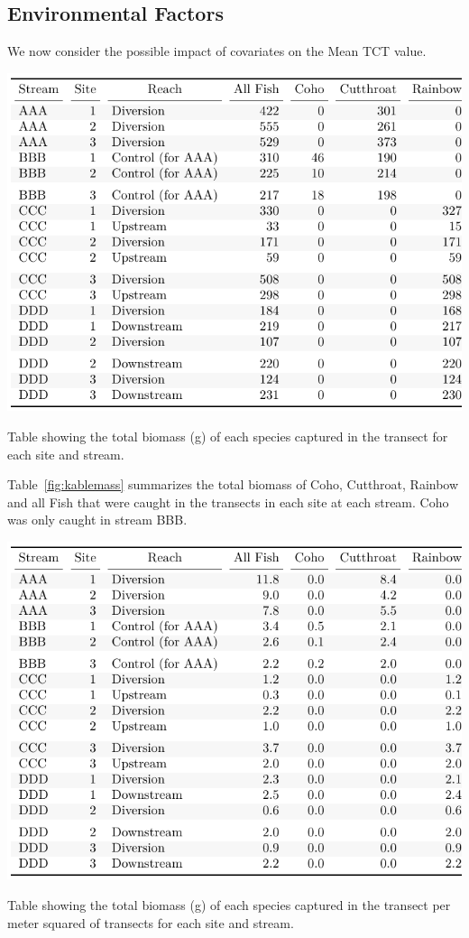 \subsection{Environmental Factors}


We now consider the possible impact of covariates on the Mean TCT value.


\begin{table}[H]
\includegraphics{Chapter5Images/biomass_kable.pdf}
\caption{ \hspace{1mm} Table showing the total biomass (g) of each species captured in the transect for each site and stream.}
\label{fig:kablemass}
\end{table}


Table~\ref{fig:kablemass} summarizes the total biomass of Coho, Cutthroat, Rainbow and all Fish that were caught in the transects in each site at each stream. Coho was only caught in stream BBB.


\begin{table}[H]
\includegraphics{Chapter5Images/kable_gm2.pdf}
\caption{   \hspace{1mm}Table showing the total biomass (g) of each species captured in the transect per meter squared of transects for each site and stream.}
\label{fig:kablemass2}
\end{table}



